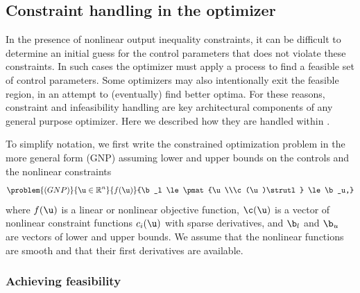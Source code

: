 


\subsection{Constraint handling in the optimizer} \label{sec:constr-opt}
In the presence of nonlinear output inequality constraints, 
it can be difficult to determine an initial guess for the control parameters that does 
not violate these constraints. In such cases
the optimizer must apply a process to find a feasible set of control parameters. Some optimizers may also intentionally exit the feasible region, in an attempt to (eventually) find better optima. For these reasons, constraint and infeasibility handling are key architectural components of any general purpose optimizer. Here we described how they are handled within \SNOPT{}. 

To simplify notation, we first write the constrained optimization problem in the more 
general form (GNP) assuming lower and upper bounds on the controls and the nonlinear
constraints
$$
   \problem{(GNP)}{\u \in \mathbb R^n}{f(\u)}
      {\b_l \le \pmat{\u\\\c(\u)\strutl} \le \b_u,}
$$
where $f(\u)$ is a linear or nonlinear objective function,
$\c(\u)$ is a vector of nonlinear constraint functions $c_i(\u)$
with sparse derivatives, and $\b_l$ and $\b_u$
are vectors of lower and upper bounds.
We assume that the nonlinear functions are smooth and that their first
derivatives are available.

\subsubsection{Achieving feasibility} \label{sec-infeas}

